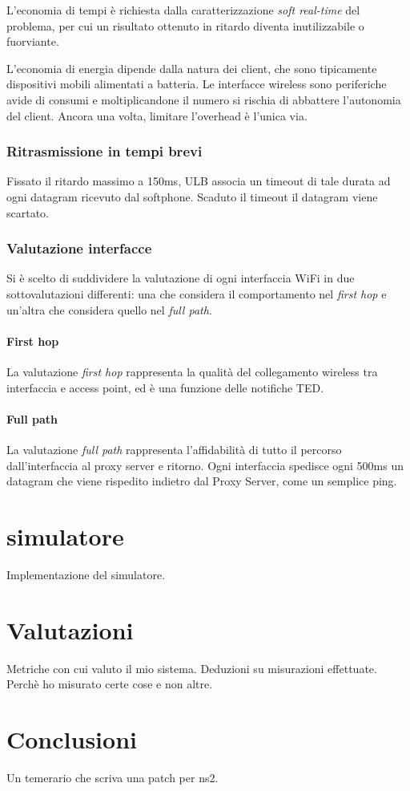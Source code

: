 \documentclass[12pt,a4paper,openright,twoside]{book}
\begin{document}
L'economia di tempi è richiesta dalla caratterizzazione \emph{soft
  real-time} del problema, per cui un risultato ottenuto in ritardo
diventa inutilizzabile o fuorviante.

L'economia di energia dipende dalla natura dei client, che sono
tipicamente dispositivi mobili alimentati a batteria. Le interfacce
wireless sono periferiche avide di consumi e moltiplicandone il numero
si rischia di abbattere l'autonomia del client. Ancora una volta,
limitare l'overhead è l'unica via.

\subsection{Ritrasmissione in tempi brevi}
Fissato il ritardo massimo a 150ms, ULB associa un timeout di tale
durata ad ogni datagram ricevuto dal softphone. Scaduto il timeout il
datagram viene scartato.

\subsection{Valutazione interfacce}
Si è scelto di suddividere la valutazione di ogni interfaccia WiFi in
due sottovalutazioni differenti: una che considera il comportamento
nel \emph{first hop} e un'altra che considera quello nel \emph{full
  path}.

\subsubsection{First hop}
La valutazione \emph{first hop} rappresenta la qualità del
collegamento wireless tra interfaccia e access point, ed è una
funzione delle notifiche TED.

\subsubsection{Full path}
La valutazione \emph{full path} rappresenta l'affidabilità di tutto il
percorso dall'interfaccia al proxy server e ritorno. Ogni interfaccia
spedisce ogni 500ms un datagram che viene rispedito indietro dal Proxy
Server, come un semplice ping.

\chapter{simulatore}
Implementazione del simulatore.

\chapter{Valutazioni}
Metriche con cui valuto il mio sistema. Deduzioni su misurazioni
effettuate. Perchè ho misurato certe cose e non altre.

\chapter*{Conclusioni}
Un temerario che scriva una patch per ns2.
\end{document}
